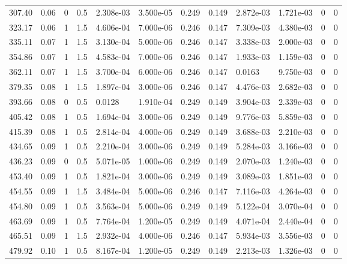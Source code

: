 \documentclass[preview]{standalone}
\begin{document}
{{\begin{tabular}{L{1.2cm}C{1.2cm} C{0.3cm}C{0.5cm} C{1.4cm}C{1.4cm} C{1.4cm}C{1.4cm} C{1.6cm}C{1.6cm} C{1.6cm}C{1.6cm}}
  307.40  &  0.06  & 0     & 0.5 &  2.308e-03  & 3.500e-05  &  0.249&   0.149& 2.872e-03 & 1.721e-03   &  0 & 0  \\ 
  323.17  &  0.06  & 1     & 1.5 &  4.606e-04  & 7.000e-06  &  0.246&   0.147& 7.309e-03 & 4.380e-03   &  0 & 0  \\ 
  335.11  &  0.07  & 1     & 1.5 &  3.130e-04  & 5.000e-06  &  0.246&   0.147& 3.338e-03 & 2.000e-03   &  0 & 0  \\ 
  354.86  &  0.07  & 1     & 1.5 &  4.583e-04  & 7.000e-06  &  0.246&   0.147& 1.933e-03 & 1.159e-03   &  0 & 0  \\ 
  362.11  &  0.07  & 1     & 1.5 &  3.700e-04  & 6.000e-06  &  0.246&   0.147& 0.0163 & 9.750e-03   &  0 & 0  \\ 
  379.35  &  0.08  & 1     & 1.5 &  1.897e-04  & 3.000e-06  &  0.246&   0.147& 4.476e-03 & 2.682e-03   &  0 & 0  \\ 
  393.66  &  0.08  & 0     & 0.5 &  0.0128  & 1.910e-04  &  0.249&   0.149& 3.904e-03 & 2.339e-03   &  0 & 0  \\ 
  405.42  &  0.08  & 1     & 0.5 &  1.694e-04  & 3.000e-06  &  0.249&   0.149& 9.776e-03 & 5.859e-03   &  0 & 0  \\ 
  415.39  &  0.08  & 1     & 0.5 &  2.814e-04  & 4.000e-06  &  0.249&   0.149& 3.688e-03 & 2.210e-03   &  0 & 0  \\ 
  434.65  &  0.09  & 1     & 0.5 &  2.210e-04  & 3.000e-06  &  0.249&   0.149& 5.284e-03 & 3.166e-03   &  0 & 0  \\ 
  436.23  &  0.09  & 0     & 0.5 &  5.071e-05  & 1.000e-06  &  0.249&   0.149& 2.070e-03 & 1.240e-03   &  0 & 0  \\ 
  453.40  &  0.09  & 1     & 0.5 &  1.821e-04  & 3.000e-06  &  0.249&   0.149& 3.089e-03 & 1.851e-03   &  0 & 0  \\ 
  454.55  &  0.09  & 1     & 1.5 &  3.484e-04  & 5.000e-06  &  0.246&   0.147& 7.116e-03 & 4.264e-03   &  0 & 0  \\ 
  454.80  &  0.09  & 1     & 0.5 &  3.563e-04  & 5.000e-06  &  0.249&   0.149& 5.122e-04 & 3.070e-04   &  0 & 0  \\ 
  463.69  &  0.09  & 1     & 0.5 &  7.764e-04  & 1.200e-05  &  0.249&   0.149& 4.071e-04 & 2.440e-04   &  0 & 0  \\ 
  465.51  &  0.09  & 1     & 1.5 &  2.932e-04  & 4.000e-06  &  0.246&   0.147& 5.934e-03 & 3.556e-03   &  0 & 0  \\ 
  479.92  &  0.10  & 1     & 0.5 &  8.167e-04  & 1.200e-05  &  0.249&   0.149& 2.213e-03 & 1.326e-03   &  0 & 0  \\ 

\end{tabular}}}
\end{document}
